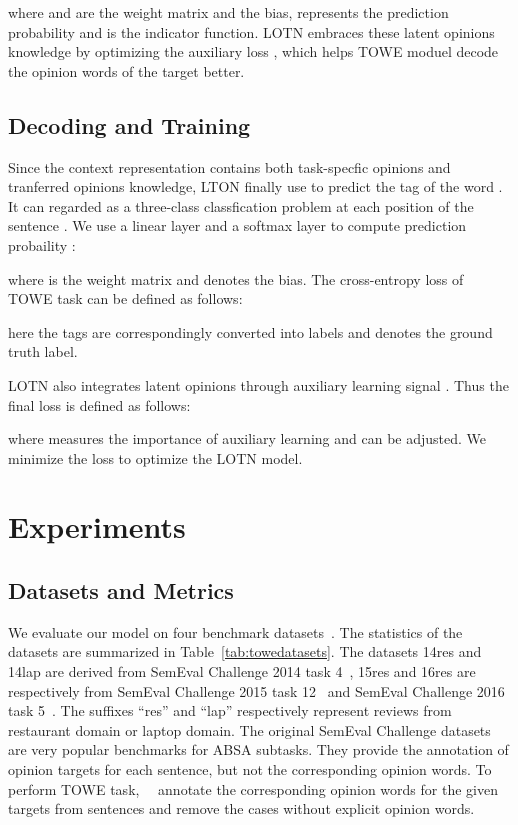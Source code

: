 \documentclass[letterpaper]{article} \usepackage{aaai20}  \usepackage{times}  \usepackage{helvet} \usepackage{courier}  \usepackage[hyphens]{url}  \usepackage{graphicx} \urlstyle{rm} \def\UrlFont{\rm}  \usepackage{graphicx}
\begin{document}
where  and  are the weight matrix and  the bias,  represents the prediction probability and  is the indicator function. LOTN embraces these latent opinions knowledge by optimizing the auxiliary loss , which helps TOWE moduel decode the opinion words of the target better.

\subsection{Decoding and Training}
Since the context representation  contains both task-specfic opinions and tranferred opinions knowledge, LTON finally use  to predict the tag  of the word . It can regarded as a three-class classfication problem at each position of the sentence . We use a linear layer and a softmax layer to compute prediction probaility :

where  is the weight matrix and  denotes the bias. The cross-entropy loss of TOWE task can be defined as follows:

here the tags  are correspondingly converted into labels  and  denotes the ground truth label.

LOTN also integrates latent opinions through auxiliary learning signal . Thus the final loss is defined as follows:

where  measures the importance of auxiliary learning and can be adjusted. We minimize the loss  to optimize the LOTN model.

\section{Experiments}
\subsection{Datasets and Metrics}
We evaluate our model on four benchmark datasets~\cite{DBLP:conf/naacl/FanWDHC19}. The statistics of the datasets are summarized in Table~\ref{tab:towedatasets}. The datasets 14res and 14lap are derived from SemEval Challenge 2014 task 4~\cite{DBLP:conf/semeval/PontikiGPPAM14}, 15res and 16res are respectively from SemEval Challenge 2015 task 12~\cite{DBLP:conf/semeval/PontikiGPMA15} and SemEval Challenge 2016 task 5~\cite{DBLP:conf/semeval/PontikiGPAMAAZQ16}. The suffixes ``res'' and ``lap'' respectively represent reviews from restaurant domain or laptop domain. The original SemEval Challenge datasets are very popular benchmarks for ABSA subtasks. They provide the annotation of opinion targets for each sentence, but not the corresponding opinion words. To perform TOWE task,~\citeauthor{DBLP:conf/naacl/FanWDHC19}~ annotate the corresponding opinion words for the given targets from sentences and remove the cases without explicit opinion words.
\end{document}

